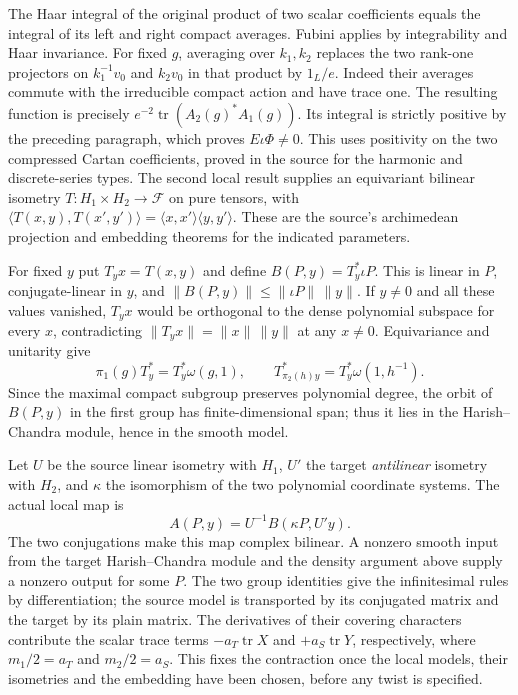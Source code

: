 The Haar integral of the original product of two scalar coefficients
equals the integral of its left and right compact averages. Fubini
applies by integrability and Haar invariance. For fixed $g$, averaging
over $k_1,k_2$ replaces the two rank-one projectors on $k_1^{-1}v_0$
and $k_2v_0$ in that product by $1_L/e$. Indeed their averages
commute with the irreducible compact action and have trace one.
The resulting function is precisely
$e^{-2}\operatorname{tr}(A_2(g)^*A_1(g))$. Its integral is strictly
positive by the preceding paragraph, which proves $E\iota\Phi\ne0$.
This uses positivity on the two compressed Cartan coefficients,
proved in the source for the harmonic and discrete-series types.
The second local result supplies an equivariant bilinear isometry
$T:H_1\times H_2\to\mathcal F$ on pure tensors, with
$\langle T(x,y),T(x',y')\rangle=
\langle x,x'\rangle\langle y,y'\rangle$.
These are the source's archimedean projection and embedding theorems
for the indicated parameters.

For fixed $y$ put $T_y x=T(x,y)$ and define
$B(P,y)=T_y^*\iota P$. This is linear in $P$, conjugate-linear in
$y$, and $\|B(P,y)\|\le\|\iota P\|\,\|y\|$. If $y\ne0$ and all these
values vanished, $T_y x$ would be orthogonal to the dense polynomial
subspace for every $x$, contradicting
$\|T_y x\|=\|x\|\,\|y\|$ at any $x\ne0$. Equivariance and
unitarity give
\[
 \pi_1(g)T_y^*=T_y^*\omega(g,1),\qquad
 T_{\pi_2(h)y}^*=T_y^*\omega(1,h^{-1}).
\]
Since the maximal compact subgroup preserves polynomial degree, the
orbit of $B(P,y)$ in the first group has finite-dimensional span;
thus it lies in the Harish--Chandra module, hence in the smooth model.

Let $U$ be the source linear isometry with $H_1$, $U'$ the target
\emph{antilinear} isometry with $H_2$, and $\kappa$ the isomorphism
of the two polynomial coordinate systems. The actual local map is
\[
             A(P,y)=U^{-1}B(\kappa P,U'y).
\]
The two conjugations make this map complex bilinear. A nonzero smooth
input from the target Harish--Chandra module and the density argument
above supply a nonzero output for some $P$. The two group identities
give the infinitesimal rules by differentiation; the source model is
transported by its conjugated matrix and the target by its plain
matrix. The derivatives of their covering characters contribute the
scalar trace terms $-a_T\operatorname{tr}X$ and
$+a_S\operatorname{tr}Y$, respectively, where $m_1/2=a_T$ and
$m_2/2=a_S$. This fixes the contraction once the local models, their isometries
and the embedding have been chosen, before any twist is specified.

